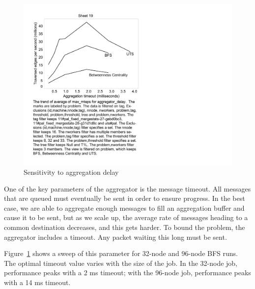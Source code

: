 \begin{figure}[htb]
\begin{center}
  \includegraphics[width=0.95\columnwidth]{figs/flushticks_sweep}
\begin{minipage}{0.95\columnwidth}
  \caption{\label{fig:bfs-sweep-flushticks} Sensitivity to aggregation delay}
\end{minipage}
\vspace{-3ex}
\end{center}
\end{figure}


One of the key parameters of the aggregator is the message
timeout. All messages that are queued must eventually be sent in order
to ensure progress. In the best case, we are able to aggregate enough
messages to fill an aggregation buffer and cause it to be sent, but as
we scale up, the average rate of messages heading to a common
destination decreases, and this gets harder. To bound the problem, the
aggregator includes a timeout. Any packet waiting this long must be sent.

Figure~\ref{fig:bfs-sweep-flushticks} shows a sweep of this parameter
for 32-node and 96-node BFS runs. The optimal timeout value varies
with the size of the job. In the 32-node job, performance peaks with a
2 ms timeout; with the 96-node job, performance peaks with a 14 ms
timeout.

